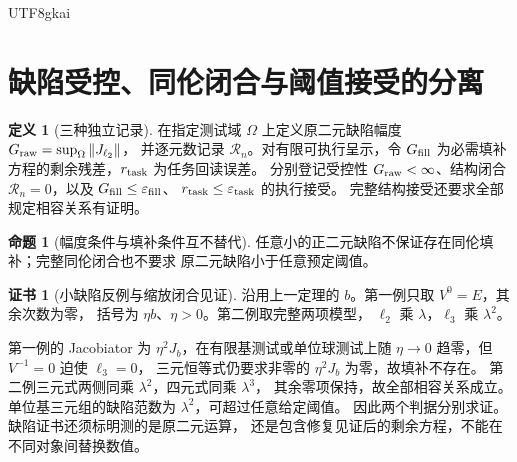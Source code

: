 \documentclass[12pt]{report}
\makeatletter
\theoremstyle{definition}
\newtheorem{definition}{定义}[chapter]
\newtheorem{proposition}{命题}[chapter]
\newtheorem{Certificate}{证书}[chapter]
\renewenvironment{proof}[1][\proofname]{\par
  \pushQED{\qed}\normalfont
  \topsep6\p@\@plus6\p@\relax
  \trivlist
  \item[\hskip\labelsep\normalfont #1\@addpunct{.}]\ignorespaces
}{
  \popQED\endtrivlist\@endpefalse
}
\newcommand{\norm}[1]{\left\lVert#1\right\rVert}
\makeatother
\begin{document}
\begin{CJK*}{UTF8}{gkai}
\section{缺陷受控、同伦闭合与阈值接受的分离}
\begin{definition}[三种独立记录]
在指定测试域 \(\Omega\) 上定义原二元缺陷幅度
\(G_{\rm raw}=\sup_{\Omega}\norm{J_{\ell_2}}\)，
并逐元数记录 \(\mathcal R_n\)。对有限可执行呈示，令
\(G_{\rm fill}\) 为必需填补方程的剩余残差，\(r_{\rm task}\) 为任务回读误差。
分别登记受控性 \(G_{\rm raw}<\infty\)、结构闭合 \(\mathcal R_n=0\)，以及
\(G_{\rm fill}\le\varepsilon_{\rm fill}\)、
\(r_{\rm task}\le\varepsilon_{\rm task}\) 的执行接受。
完整结构接受还要求全部规定相容关系有证明。
\end{definition}
\begin{proposition}[幅度条件与填补条件互不替代]
\label{prop:gap-gates}
任意小的正二元缺陷不保证存在同伦填补；完整同伦闭合也不要求
原二元缺陷小于任意预定阈值。
\end{proposition}
\begin{Certificate}[小缺陷反例与缩放闭合见证]
沿用上一定理的 \(b\)。第一例只取 \(V^0=E\)，其余次数为零，
括号为 \(\eta b\)、\(\eta>0\)。第二例取完整两项模型，
\(\ell_2\) 乘 \(\lambda\)，\(\ell_3\) 乘 \(\lambda^2\)。
\end{Certificate}
\begin{proof}
第一例的 Jacobiator 为 \(\eta^2J_b\)，在有限基测试或单位球测试上随
\(\eta\to0\) 趋零，但 \(V^{-1}=0\) 迫使 \(\ell_3=0\)，
三元恒等式仍要求非零的 \(\eta^2J_b\) 为零，故填补不存在。
第二例三元式两侧同乘 \(\lambda^2\)，四元式同乘 \(\lambda^3\)，
其余零项保持，故全部相容关系成立。
单位基三元组的缺陷范数为 \(\lambda^2\)，可超过任意给定阈值。
因此两个判据分别求证。缺陷证书还须标明测的是原二元运算，
还是包含修复见证后的剩余方程，不能在不同对象间替换数值\cite{pure}。
\end{proof}


\end{CJK*}
\end{document}
